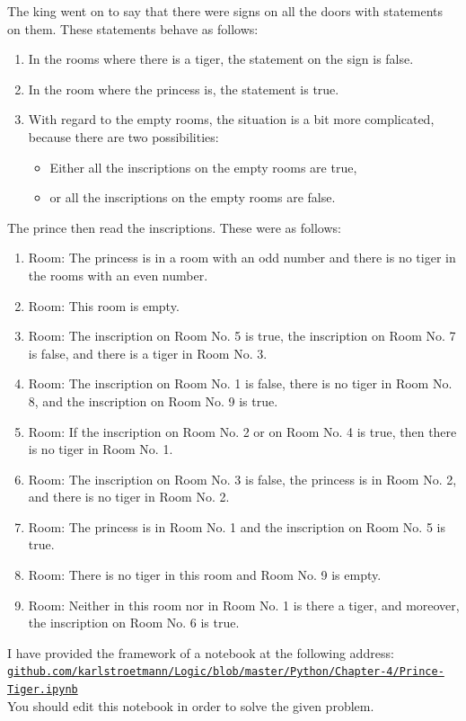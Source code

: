The king went on to say that there were signs on all the doors with statements on them. These statements behave as follows:
\begin{enumerate}
\item In the rooms where there is a tiger, the statement on the sign is false.
\item In the room where the princess is, the statement is true.
\item With regard to the empty rooms, the situation is a bit more
      complicated, because there are two possibilities:
      \begin{itemize}
      \item Either all the inscriptions on the empty rooms are true,
      \item or all the inscriptions on the empty rooms are false.
      \end{itemize}

\end{enumerate}
The prince then read the inscriptions. These were as follows:
\begin{enumerate}
\item Room: The princess is in a room with an odd number and
      there is no tiger in the rooms with an even number.
\item Room: This room is empty.
\item Room: The inscription on Room No. 5 is true, the inscription on Room No. 7 is false,
      and there is a tiger in Room No. 3.
\item Room: The inscription on Room No. 1 is false, there is no tiger in Room No. 8,
      and the inscription on Room No. 9 is true.
\item Room: If the inscription on Room No. 2 or on Room No. 4 is true,
      then there is no tiger in Room No. 1.
\item Room: The inscription on Room No. 3 is false, the princess is in Room No. 2,
      and there is no tiger in Room No. 2.
\item Room: The princess is in Room No. 1 and the inscription on Room No. 5 is true.
\item Room: There is no tiger in this room and Room No. 9 is empty.
\item Room: Neither in this room nor in Room No. 1 is there a tiger, and moreover, the
      inscription on Room No. 6 is true.
\end{enumerate} 
I have provided the framework of a notebook at the following address:
\\[0.2cm]
\href{https://github.com/karlstroetmann/Logic/blob/master/Python/Chapter-4/Prince-Tiger.ipynb}{\small\texttt{github.com/karlstroetmann/Logic/blob/master/Python/Chapter-4/Prince-Tiger.ipynb}}
\\[0.2cm]
You should edit this notebook in order to solve the given problem. \eox
\vspace*{1cm}

